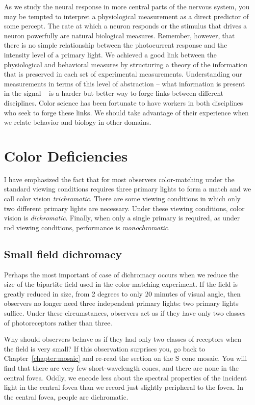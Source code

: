As we study the neural response in more central parts of
the nervous system, you may be tempted
to interpret a physiological measurement
as a direct predictor of some percept.
The rate at which a neuron responds or the stimulus
that drives a neuron powerfully
are natural biological measures.
Remember, however, that
there is no simple relationship
between the photocurrent response
and the intensity level of a primary light.
We achieved a good
link between the physiological and behavioral measures
by structuring a theory of the information that is preserved
in each set of  experimental measurements.
Understanding our measurements in terms of this level
of abstraction -- what information is present in the
signal -- is a harder but better way to forge links
between different disciplines.
Color science has been fortunate to have workers in both
disciplines who seek to forge these links.
We should take advantage of their experience
when we relate behavior and biology in other domains.

\section{Color Deficiencies}

I have emphasized the fact that for most observers color-matching
under the standard viewing conditions requires
three primary lights to form a match and we call
color vision {\em trichromatic}.
There are some viewing conditions in which
only two different primary lights are necessary.
Under these viewing conditions, color vision is {\em dichromatic}.
Finally, when only a single primary is required, as under
rod viewing conditions, performance is {\em monochromatic}.

\subsection*{Small field dichromacy}
Perhaps the most important of case of dichromacy occurs when
we reduce the size of the bipartite
field used in the color-matching experiment.
If the field is greatly reduced in size, from
2 degrees to only 20 minutes of visual angle,
then observers no longer need three independent
primary lights:
two primary lights suffice.
Under these circumstances, observers act as if they have
only two classes of photoreceptors rather than three.

Why should observers behave as if they had only two
classes of receptors when the field is very small?
If this observation surprises you, go back to
Chapter~\ref{chapter:mosaic}
and re-read the section on the $\mbox{S}$ cone mosaic.
You will find that there are very few short-wavelength cones,
and there are none
in the central fovea.
Oddly,
we encode less about the spectral properties of the incident
light in the central fovea
than we record just slightly peripheral to the fovea.
In the central fovea, people are dichromatic.

